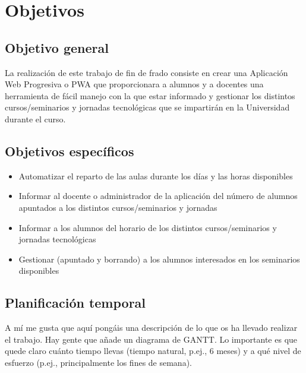 \documentclass[a4paper, 12pt]{book}
\begin{document}
\cleardoublepage %
\chapter{Objetivos} %
\label{chap:objetivos} %

\section{Objetivo general} %
\label{sec:objetivo-general} %

La realización de este trabajo de fin de frado consiste en crear una Aplicación Web Progresiva o PWA que proporcionara a alumnos y a docentes una herramienta de fácil manejo con la que estar informado y gestionar los distintos cursos/seminarios y jornadas tecnológicas que se impartirán en la Universidad durante el curso.


\section{Objetivos específicos}
\label{sec:objetivos-especificos}

\begin{itemize}
  \item Automatizar el reparto de las aulas durante los días y las horas disponibles
  \item Informar al docente o administrador de la aplicación del número de alumnos apuntados a los distintos cursos/seminarios y jornadas
  \item Informar a los alumnos del horario de los distintos cursos/seminarios y jornadas tecnológicas
  \item Gestionar (apuntado y borrando) a los alumnos interesados en los seminarios disponibles
\end{itemize}


\section{Planificación temporal}
\label{sec:planificacion-temporal}

A mí me gusta que aquí pongáis una descripción de lo que os ha llevado realizar el trabajo.
Hay gente que añade un diagrama de GANTT.
Lo importante es que quede claro cuánto tiempo llevas (tiempo natural, p.ej., 6 meses) y a qué nivel de esfuerzo (p.ej., principalmente los fines de semana).
\end{document}
